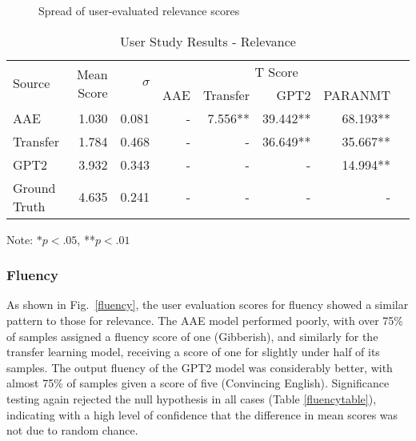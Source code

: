 \documentclass[12pt,a4paper]{article}
\begin{document}
\begin{figure}[htp]
  \centering
  
  \caption{Spread of user-evaluated relevance scores}
  \label{relevance}
\end{figure}

\begin{table}[htp]
\centering
  \caption {User Study Results - Relevance} \label{relevancetable} 
  \vspace{2pt}
  \begin{tabular}{lrrrrrrr}
      \toprule
      \multirow{2}{*}{Source} &  \multirow{2}{*}{Mean Score} &  \multirow{2}{*}{$\sigma$} & \multicolumn{4}{c}{T Score}\\
      \cmidrule{4-7} 
      &&& AAE & Transfer & GPT2 & P{\footnotesize ARA}NMT\\
     \midrule
      AAE & 1.030 & 0.081      & - & 7.556** & 39.442** & 68.193** \\
      Transfer & 1.784 & 0.468      & - & -     & 36.649**  & 35.667** \\
      GPT2 & 3.932 & 0.343 & - & -     & -      & 14.994** \\
      Ground Truth & 4.635 & 0.241  & - & -     & -      & - \\
      \bottomrule
          \hline
  \end{tabular}
        \begin{flushright}
      \footnotesize{Note: $*p<.05$, **$p<.01$\hphantom{abcabaa}}
    \end{flushright}
\end{table}

\vspace{-8mm}
\subsubsection{Fluency}

\noindent As shown in Fig.\ \ref{fluency}, the user evaluation scores for fluency showed a similar pattern to those for relevance. The AAE model performed poorly, with over 75\% of samples assigned a fluency score of one (Gibberish), and similarly for the transfer learning model, receiving a score of one for slightly under half of its samples. The output fluency of the GPT2 model was considerably better, with almost 75\% of samples given a score of five (Convincing English). Significance testing again rejected the null hypothesis in all cases (Table \ref{fluencytable}), indicating with a high level of confidence that the difference in mean scores was not due to random chance.
\end{document}
